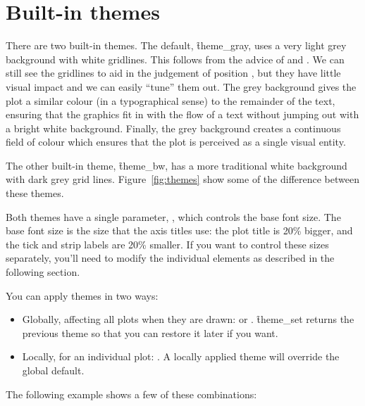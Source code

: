 \section{Built-in themes}
\label{sec:built_in}

There are two built-in themes.  The default, \f{theme_gray}, uses a very light grey background with white gridlines.  This follows from the advice of \citet{tufte:2006,tufte:1990,tufte:2001,tufte:1997} and \citet{brewer:1994,carr:2002,carr:1994,carr:1999}. We can still see the gridlines to aid in the judgement of position \citep{cleveland:1993a}, but they have little visual impact and we can easily ``tune'' them out. The grey background gives the plot a similar colour (in a typographical sense) to the remainder of the text, ensuring that the graphics fit in with the flow of a text without jumping out with a bright white background. Finally, the grey background creates a continuous field of colour which ensures that the plot is perceived as a single visual entity. 

The other built-in theme, \f{theme_bw}, has a more traditional white background with dark grey grid lines.  Figure~\ref{fig:themes} show some of the difference between these themes.

Both themes have a single parameter, , which controls the base font size.  The base font size is the size that the axis titles use: the plot title is 20\% bigger, and the tick and strip labels are 20\% smaller.  If you want to control these sizes separately, you'll need to modify the individual elements as described in the following section.

You can apply themes in two ways:

\begin{itemize}
  \item Globally, affecting all plots when they are drawn:  or .  \f{theme_set} returns the previous theme so that you can restore it later if you want.
  
  \item Locally, for an individual plot:  .  A locally applied theme will override the global default.
\end{itemize}

\noindent The following example shows a few of these combinations:

% 


